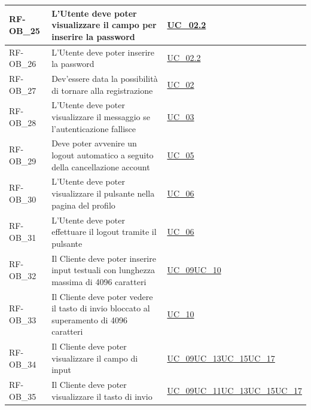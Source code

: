 \begin{longtable}{|>{\raggedright}p{}|>{\raggedright\arraybackslash}p{}|>{\raggedright\arraybackslash}p{}|}
	\hline
	RF-OB\_25 \hypertarget{rf-ob_25} & L'Utente deve poter visualizzare il campo per inserire la password & \hyperref[uc_02.2]{UC\_02.2} \\
	\hline
	RF-OB\_26 \hypertarget{rf-ob_26} & L'Utente deve poter inserire la password & \hyperref[uc_02.2]{UC\_02.2} \\
	\hline
	RF-OB\_27 \hypertarget{rf-ob_27} & Dev'essere data la possibilità di tornare alla registrazione & \hyperref[uc_02]{UC\_02} \\
	\hline
	RF-OB\_28 \hypertarget{rf-ob_28} & L'Utente deve poter visualizzare il messaggio \vr{Username o password errati} se l'autenticazione fallisce & \hyperref[uc_03]{UC\_03} \\
	\hline
	RF-OB\_29 \hypertarget{rf-ob_29} & Deve poter avvenire un logout automatico a seguito della cancellazione account & \hyperref[uc_05]{UC\_05}\\
	\hline
	RF-OB\_30 \hypertarget{rf-ob_30} & L'Utente deve poter visualizzare il pulsante \vr{Logout} nella pagina del profilo & \hyperref[uc_06]{UC\_06}\\
	\hline
	RF-OB\_31 \hypertarget{rf-ob_31} & L'Utente deve poter effettuare il logout tramite il pulsante \vr{Logout} & \hyperref[uc_06]{UC\_06} \\
	\hline
	RF-OB\_32 \hypertarget{rf-ob_32} & Il Cliente deve poter inserire input testuali con lunghezza massima di 4096 caratteri & \hyperref[uc_09]{UC\_09}\newline \hyperref[uc_10]{UC\_10} \\
	\hline
	RF-OB\_33 \hypertarget{rf-ob_33} & Il Cliente deve poter vedere il tasto di invio bloccato al superamento di 4096 caratteri & \hyperref[uc_10]{UC\_10} \\
	\hline
	RF-OB\_34 \hypertarget{rf-ob_34} & Il Cliente deve poter visualizzare il campo di input & \hyperref[uc_09]{UC\_09}\newline \hyperref[uc_13]{UC\_13}\newline \hyperref[uc_15]{UC\_15}\newline \hyperref[uc_17]{UC\_17} \\
	\hline
	RF-OB\_35 \hypertarget{rf-ob_35} & Il Cliente deve poter visualizzare il tasto di invio & \hyperref[uc_09]{UC\_09}\newline \hyperref[uc_11]{UC\_11}\newline \hyperref[uc_13]{UC\_13}\newline \hyperref[uc_15]{UC\_15}\newline \hyperref[uc_17]{UC\_17} \\

\end{longtable}
